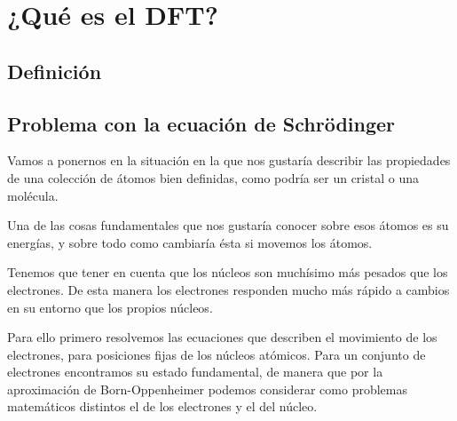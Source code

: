 \section{¿Qué es el DFT?}

\subsection{Definición}

\subsection{Problema con la ecuación de Schrödinger} 

Vamos a ponernos en la situación en la que nos gustaría describir las propiedades de una colección de átomos bien definidas, como podría ser un cristal o una molécula.

Una de las cosas fundamentales que nos gustaría conocer sobre esos átomos es su energías, y sobre todo como cambiaría ésta si movemos los átomos.

Tenemos que tener en cuenta que los núcleos son muchísimo más pesados que los electrones. De esta manera los electrones responden mucho más rápido a cambios en su entorno que los propios núcleos.

Para ello primero resolvemos las ecuaciones que describen el movimiento de los electrones, para posiciones fijas de los núcleos atómicos. Para un conjunto de electrones encontramos su estado fundamental, de manera que por la aproximación de Born-Oppenheimer podemos considerar como problemas matemáticos distintos el de los electrones y el del núcleo.